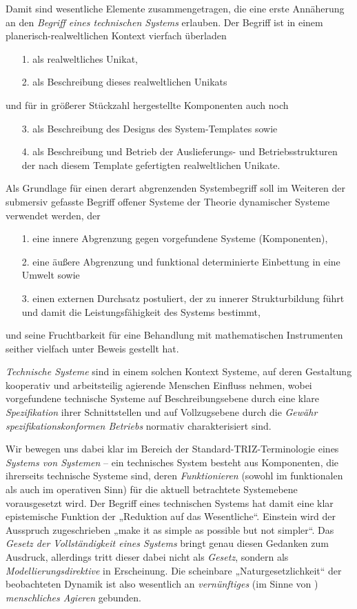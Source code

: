 \documentclass[11pt,a4paper]{article}
\begin{document}
Damit sind wesentliche Elemente zusammengetragen, die eine erste Annäherung an
den \emph{Begriff eines technischen Systems} erlauben.  Der Begriff ist in
einem planerisch-realweltlichen Kontext vierfach überladen
\begin{itemize}
\item [1.] als realweltliches Unikat,
\item [2.] als Beschreibung dieses realweltlichen Unikats
\end{itemize}
und für in größerer Stückzahl hergestellte Komponenten auch noch
\begin{itemize}
\item [3.] als Beschreibung des Designs des System-Templates sowie
\item [4.] als Beschreibung und Betrieb der Auslieferungs- und
  Betriebsstrukturen der nach diesem Template gefertigten realweltlichen
  Unikate.
\end{itemize}
Als Grundlage für einen derart abgrenzenden Systembegriff soll im Weiteren der
submersiv gefasste Begriff offener Systeme der Theorie dynamischer Systeme
\cite{Bertalanffy1950} verwendet werden, der
\begin{itemize}
\item [1.] eine innere Abgrenzung gegen vorgefundene Systeme (Komponenten), 
\item [2.] eine äußere Abgrenzung und funktional determinierte Einbettung in
  eine Umwelt sowie
\item [3.] einen externen Durchsatz postuliert, der zu innerer Strukturbildung
  führt und damit die Leistungsfähigkeit des Systems bestimmt,  
\end{itemize}
und seine Fruchtbarkeit für eine Behandlung mit mathematischen Instrumenten
seither vielfach unter Beweis gestellt hat.  

\emph{Technische Systeme} sind in einem solchen Kontext Systeme, auf deren
Gestaltung kooperativ und arbeitsteilig agierende Menschen Einfluss nehmen,
wobei vorgefundene technische Systeme auf Beschreibungsebene durch eine klare
\emph{Spezifikation} ihrer Schnittstellen und auf Vollzugsebene durch die
\emph{Gewähr spezifikationskonformen Betriebs} normativ charakterisiert sind. 

Wir bewegen uns dabei klar im Bereich der Standard-TRIZ-Terminologie eines
\emph{Systems von Systemen} -- ein technisches System besteht aus Komponenten,
die ihrerseits technische Systeme sind, deren \emph{Funktionieren} (sowohl im
funktionalen als auch im operativen Sinn) für die aktuell betrachtete
Systemebene vorausgesetzt wird. Der Begriff eines technischen Systems hat
damit eine klar epistemische Funktion der „Reduktion auf das Wesentliche“.
Einstein wird der Ausspruch zugeschrieben „make it as simple as possible but
not simpler“. Das \emph{Gesetz der Vollständigkeit eines Systems} bringt genau
diesen Gedanken zum Ausdruck, allerdings tritt dieser dabei nicht als
\emph{Gesetz}, sondern als \emph{Modellierungsdirektive} in Erscheinung.  Die
scheinbare „Naturgesetzlichkeit“ der beobachteten Dynamik ist also wesentlich
an \emph{vernünftiges} (im Sinne von \cite{Vernadsky1997}) \emph{menschliches
  Agieren} gebunden.
\end{document}
